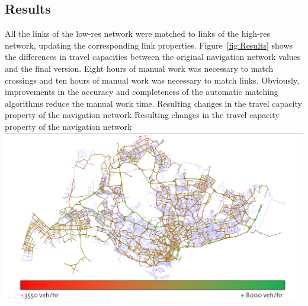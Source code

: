 \subsection{Results}
All the links of the low-res network were matched to links of the high-res network, updating the corresponding link properties. Figure~\ref{fig:Results} shows the differences in travel capacities between the original navigation network values and the final version. Eight hours of manual work was necessary to match crossings and ten hours of manual work was necessary to match links. Obviously, improvements in the accuracy and completeness of the automatic matching algorithms reduce the manual work time.
%
\createfigure
{Resulting changes in the travel capacity property of the navigation network}
{Resulting changes in the travel capacity property of the navigation network}
{\label{fig:Results}}
{\includegraphics[width=1.0\textwidth]{extending/figures/netEdSing/Result.png}}
{}

